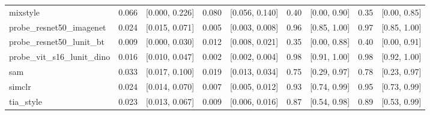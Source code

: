 \begin{tabular}{lrrrrrrrr}
mixstyle & 0.066 & [0.000, 0.226] & 0.080 & [0.056, 0.140] & 0.40 & [0.00, 0.90] & 0.35 & [0.00, 0.85] \\
probe\_resnet50\_imagenet & 0.024 & [0.015, 0.071] & 0.005 & [0.003, 0.008] & 0.96 & [0.85, 1.00] & 0.97 & [0.85, 1.00] \\
probe\_resnet50\_lunit\_bt & 0.009 & [0.000, 0.030] & 0.012 & [0.008, 0.021] & 0.35 & [0.00, 0.88] & 0.40 & [0.00, 0.91] \\
probe\_vit\_s16\_lunit\_dino & 0.016 & [0.010, 0.047] & 0.002 & [0.002, 0.004] & 0.98 & [0.91, 1.00] & 0.98 & [0.92, 1.00] \\
sam & 0.033 & [0.017, 0.100] & 0.019 & [0.013, 0.034] & 0.75 & [0.29, 0.97] & 0.78 & [0.23, 0.97] \\
simclr & 0.024 & [0.014, 0.070] & 0.007 & [0.005, 0.012] & 0.93 & [0.74, 0.99] & 0.95 & [0.73, 0.99] \\
tia\_style & 0.023 & [0.013, 0.067] & 0.009 & [0.006, 0.016] & 0.87 & [0.54, 0.98] & 0.89 & [0.53, 0.99] \\
\bottomrule
\end{tabular}
